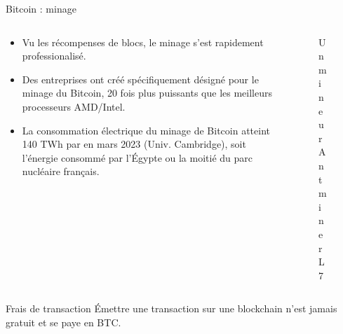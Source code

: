 \begin{frame}{Bitcoin : minage}
  \begin{columns}
    \begin{column}{0.6\textwidth}
      \begin{itemize}
        \item Vu les récompenses de blocs, le minage s'est rapidement professionalisé.
        \item Des entreprises ont créé spécifiquement désigné pour le minage du Bitcoin, 20 fois plus puissants que les meilleurs processeurs AMD/Intel.
        \item La consommation électrique du minage de Bitcoin atteint 140 TWh par en mars 2023 (Univ. Cambridge), soit l'énergie consommé par l'Égypte ou la moitié du parc nucléaire français.
      \end{itemize}
    \end{column}

    \begin{column}{0.3\textwidth}
      \begin{figure}

        \caption{Un mineur Antminer L7}
      \end{figure}
    \end{column}
    \begin{column}{0.1\textwidth}\end{column}
  \end{columns}
\end{frame}

\begin{frame}{Frais de transaction}
  Émettre une transaction sur une blockchain n'est jamais gratuit et se paye en BTC.

  
\end{frame}